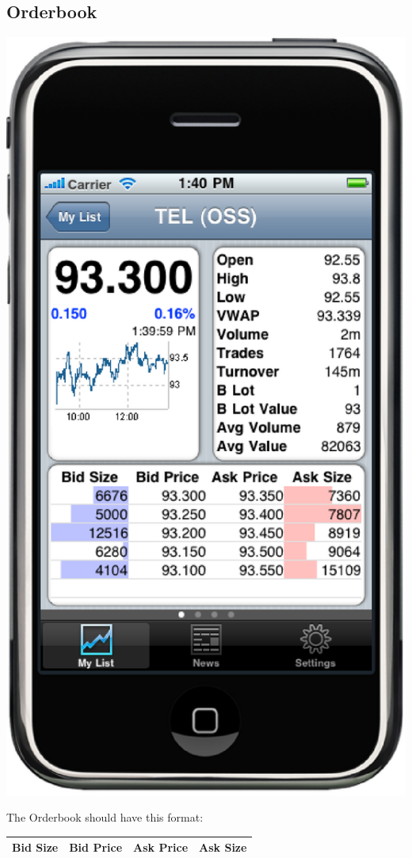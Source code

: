 \documentclass[12pt,twoside,letterpaper]{report}
\begin{document}
\subsection*{Orderbook}
\includegraphics[scale=0.5]{symbolDetailOrderbook}

The Orderbook should have this format:
\begin{tabular}{ l l l l }
\hline
Bid Size & Bid Price & Ask Price & Ask Size \\
\hline
\end{tabular}
\end{document}
